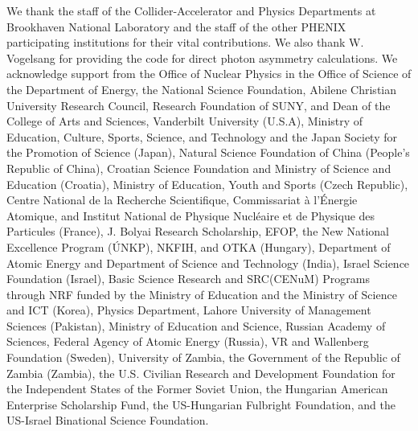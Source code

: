 \documentclass[twocolumn,letterpaper,aps,prl,longbibliography,superscriptaddress,floatfix]{revtex4-2}
\begin{document}
We thank the staff of the Collider-Accelerator and Physics
Departments at Brookhaven National Laboratory and the staff of
the other PHENIX participating institutions for their vital
contributions. We also thank W. Vogelsang for providing
the code for direct photon asymmetry calculations.
We acknowledge support from the Office of Nuclear Physics in the
Office of Science of the Department of Energy,
the National Science Foundation,
Abilene Christian University Research Council,
Research Foundation of SUNY, and
Dean of the College of Arts and Sciences, Vanderbilt University
(U.S.A),
Ministry of Education, Culture, Sports, Science, and Technology
and the Japan Society for the Promotion of Science (Japan),
Natural Science Foundation of China (People's Republic of China),
Croatian Science Foundation and
Ministry of Science and Education (Croatia),
Ministry of Education, Youth and Sports (Czech Republic),
Centre National de la Recherche Scientifique, Commissariat
{\`a} l'{\'E}nergie Atomique, and Institut National de Physique
Nucl{\'e}aire et de Physique des Particules (France),
J. Bolyai Research Scholarship, EFOP, the New National Excellence
Program ({\'U}NKP), NKFIH, and OTKA (Hungary),
Department of Atomic Energy and Department of Science and Technology
(India),
Israel Science Foundation (Israel),
Basic Science Research and SRC(CENuM) Programs through NRF
funded by the Ministry of Education and the Ministry of
Science and ICT (Korea),
Physics Department, Lahore University of Management Sciences (Pakistan),
Ministry of Education and Science, Russian Academy of Sciences,
Federal Agency of Atomic Energy (Russia),
VR and Wallenberg Foundation (Sweden),
University of Zambia, the Government of the Republic of Zambia (Zambia),
the U.S. Civilian Research and Development Foundation for the
Independent States of the Former Soviet Union,
the Hungarian American Enterprise Scholarship Fund,
the US-Hungarian Fulbright Foundation,
and the US-Israel Binational Science Foundation.


\end{document}
